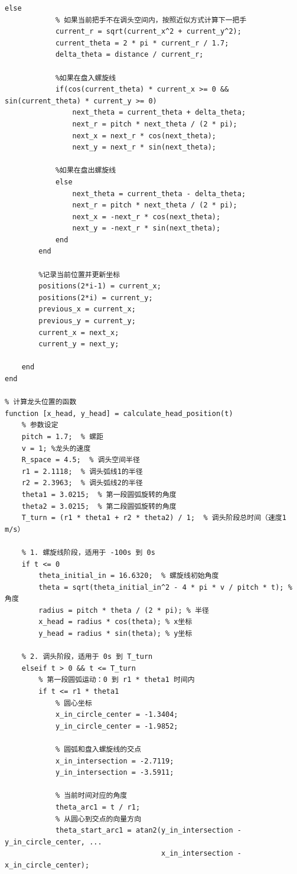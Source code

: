 \documentclass{cumcmthesis1}
\begin{document}
\begin{lstlisting}[caption={求解问题4中-100s到100s位置和速度的代码，并将计算结果保存到result4.xlsx中}, label={lst:eighth_code}]
        else
            % 如果当前把手不在调头空间内，按照近似方式计算下一把手
            current_r = sqrt(current_x^2 + current_y^2);
            current_theta = 2 * pi * current_r / 1.7;
            delta_theta = distance / current_r;

            %如果在盘入螺旋线
            if(cos(current_theta) * current_x >= 0 && sin(current_theta) * current_y >= 0)
                next_theta = current_theta + delta_theta;
                next_r = pitch * next_theta / (2 * pi);
                next_x = next_r * cos(next_theta);
                next_y = next_r * sin(next_theta);

            %如果在盘出螺旋线
            else
                next_theta = current_theta - delta_theta;
                next_r = pitch * next_theta / (2 * pi);
                next_x = -next_r * cos(next_theta);
                next_y = -next_r * sin(next_theta);
            end
        end

        %记录当前位置并更新坐标
        positions(2*i-1) = current_x;
        positions(2*i) = current_y;
        previous_x = current_x;
        previous_y = current_y;
        current_x = next_x;
        current_y = next_y;

    end
end

% 计算龙头位置的函数
function [x_head, y_head] = calculate_head_position(t)
    % 参数设定
    pitch = 1.7;  % 螺距
    v = 1; %龙头的速度
    R_space = 4.5;  % 调头空间半径
    r1 = 2.1118;  % 调头弧线1的半径
    r2 = 2.3963;  % 调头弧线2的半径
    theta1 = 3.0215;  % 第一段圆弧旋转的角度
    theta2 = 3.0215;  % 第二段圆弧旋转的角度
    T_turn = (r1 * theta1 + r2 * theta2) / 1;  % 调头阶段总时间（速度1 m/s）
    
    % 1. 螺旋线阶段，适用于 -100s 到 0s
    if t <= 0
        theta_initial_in = 16.6320;  % 螺旋线初始角度
        theta = sqrt(theta_initial_in^2 - 4 * pi * v / pitch * t); % 角度
        radius = pitch * theta / (2 * pi); % 半径
        x_head = radius * cos(theta); % x坐标
        y_head = radius * sin(theta); % y坐标
    
    % 2. 调头阶段，适用于 0s 到 T_turn
    elseif t > 0 && t <= T_turn
        % 第一段圆弧运动：0 到 r1 * theta1 时间内
        if t <= r1 * theta1
            % 圆心坐标
            x_in_circle_center = -1.3404;
            y_in_circle_center = -1.9852;

            % 圆弧和盘入螺旋线的交点
            x_in_intersection = -2.7119;
            y_in_intersection = -3.5911;

            % 当前时间对应的角度
            theta_arc1 = t / r1;  
            % 从圆心到交点的向量方向
            theta_start_arc1 = atan2(y_in_intersection - y_in_circle_center, ...
                                     x_in_intersection - x_in_circle_center);
                                 

\end{lstlisting}
\end{document}
